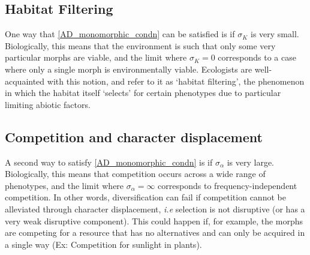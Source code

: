 \subsection{Habitat Filtering}
One way that \ref{AD_monomorphic_condn} can be satisfied is if $\sigma_K$ is very small. Biologically, this means that the environment is such that only some very particular morphs are viable, and the limit where $\sigma_K = 0$ corresponds to a case where only a single morph is environmentally viable. Ecologists are well-acquainted with this notion, and refer to it as `habitat filtering', the phenomenon in which the habitat itself `selects' for certain phenotypes due to particular limiting abiotic factors.

\subsection{Competition and character displacement}
A second way to satisfy \ref{AD_monomorphic_condn} is if $\sigma_{\alpha}$ is very large. Biologically, this means that competition occurs across a wide range of phenotypes, and the limit where $\sigma_{\alpha} = \infty$ corresponds to frequency-independent competition. In other words, diversification can fail if competition cannot be alleviated through character displacement, \emph{i.e} selection is not disruptive (or has a very weak disruptive component). This could happen if, for example, the morphs are competing for a resource that has no alternatives and can only be acquired in a single way (Ex: Competition for sunlight in plants).


